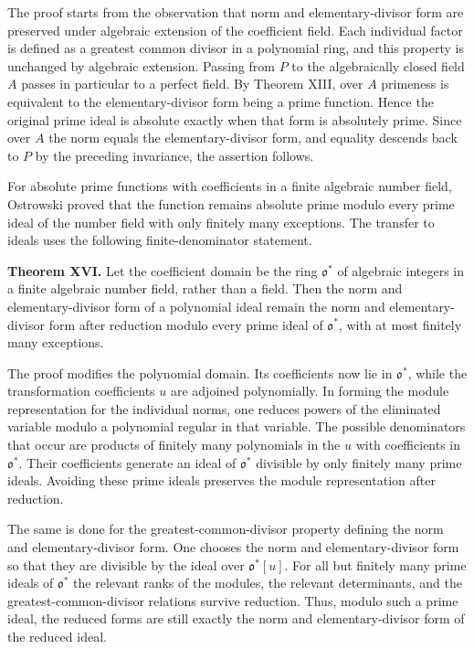 \documentclass[11pt]{article}
\begin{document}
The proof starts from the observation that norm and elementary-divisor form are preserved under algebraic extension of the coefficient field. Each individual factor is defined as a greatest common divisor in a polynomial ring, and this property is unchanged by algebraic extension. Passing from $P$ to the algebraically closed field $A$ passes in particular to a perfect field. By Theorem XIII, over $A$ primeness is equivalent to the elementary-divisor form being a prime function. Hence the original prime ideal is absolute exactly when that form is absolutely prime. Since over $A$ the norm equals the elementary-divisor form, and equality descends back to $P$ by the preceding invariance, the assertion follows.

For absolute prime functions with coefficients in a finite algebraic number field, Ostrowski proved that the function remains absolute prime modulo every prime ideal of the number field with only finitely many exceptions. The transfer to ideals uses the following finite-denominator statement.

\textbf{Theorem XVI.} Let the coefficient domain be the ring $\mathfrak o^*$ of algebraic integers in a finite algebraic number field, rather than a field. Then the norm and elementary-divisor form of a polynomial ideal remain the norm and elementary-divisor form after reduction modulo every prime ideal of $\mathfrak o^*$, with at most finitely many exceptions.

The proof modifies the polynomial domain. Its coefficients now lie in $\mathfrak o^*$, while the transformation coefficients $u$ are adjoined polynomially. In forming the module representation for the individual norms, one reduces powers of the eliminated variable modulo a polynomial regular in that variable. The possible denominators that occur are products of finitely many polynomials in the $u$ with coefficients in $\mathfrak o^*$. Their coefficients generate an ideal of $\mathfrak o^*$ divisible by only finitely many prime ideals. Avoiding these prime ideals preserves the module representation after reduction.

The same is done for the greatest-common-divisor property defining the norm and elementary-divisor form. One chooses the norm and elementary-divisor form so that they are divisible by the ideal over $\mathfrak o^*[u]$. For all but finitely many prime ideals of $\mathfrak o^*$ the relevant ranks of the modules, the relevant determinants, and the greatest-common-divisor relations survive reduction. Thus, modulo such a prime ideal, the reduced forms are still exactly the norm and elementary-divisor form of the reduced ideal.
\end{document}
